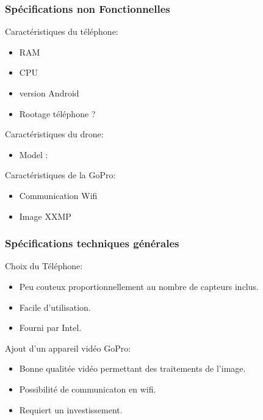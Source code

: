 \documentclass[transparent]{beamer}
\begin{document}
\begin{frame}
	\frametitle{Spécifications non Fonctionnelles}
	\begin{block}{Caractéristiques du téléphone:}
			\begin{itemize}
				\item RAM
				\item CPU
				\item version Android
				\item Rootage téléphone ?
			\end{itemize}
	\end{block}

	\begin{block}{Caractéristiques du drone:}
			\begin{itemize}
				\item Model :
			\end{itemize}
	\end{block}

	\begin{block}{Caractéristiques de la GoPro:}
			\begin{itemize}
				\item Communication Wifi
				\item Image XXMP
			\end{itemize}
	\end{block}
\end{frame}

\begin{frame}
	\frametitle{Spécifications techniques générales}
	\begin{block}{Choix du Téléphone:}
			\begin{itemize}
				\item Peu couteux proportionnellement au nombre de capteurs inclus.
				\item Facile d'utilisation.
				\item Fourni par Intel.
			\end{itemize}
	\end{block}
	\begin{block}{Ajout d'un appareil vidéo GoPro:}
			\begin{itemize}
				\item Bonne qualitée vidéo permettant des traitements de l'image.
				\item Possibilité de communicaton en wifi.
				\item Requiert un investissement.
			\end{itemize}
	\end{block}
\end{frame}
\end{document}
